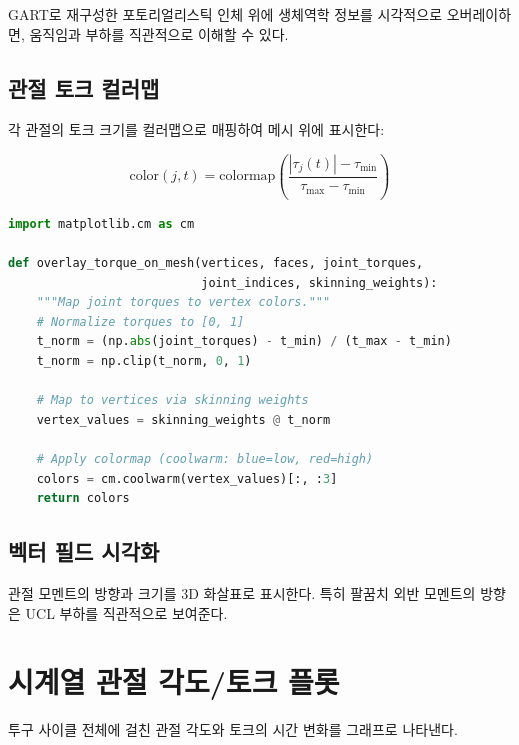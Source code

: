 \documentclass[11pt, a4paper]{report}
\begin{document}
GART로 재구성한 포토리얼리스틱 인체 위에 생체역학 정보를 시각적으로 오버레이하면,
움직임과 부하를 직관적으로 이해할 수 있다.

\subsection{관절 토크 컬러맵}

각 관절의 토크 크기를 컬러맵으로 매핑하여 메시 위에 표시한다:

\begin{equation}
  \text{color}(j, t) = \text{colormap}\!\left(\frac{|\tau_j(t)| - \tau_{\min}}{\tau_{\max} - \tau_{\min}}\right)
\end{equation}

\begin{codebox}[title={토크 오버레이 렌더링}]
\begin{lstlisting}[language=Python]
import matplotlib.cm as cm

def overlay_torque_on_mesh(vertices, faces, joint_torques,
                           joint_indices, skinning_weights):
    """Map joint torques to vertex colors."""
    # Normalize torques to [0, 1]
    t_norm = (np.abs(joint_torques) - t_min) / (t_max - t_min)
    t_norm = np.clip(t_norm, 0, 1)

    # Map to vertices via skinning weights
    vertex_values = skinning_weights @ t_norm

    # Apply colormap (coolwarm: blue=low, red=high)
    colors = cm.coolwarm(vertex_values)[:, :3]
    return colors
\end{lstlisting}
\end{codebox}

\subsection{벡터 필드 시각화}

관절 모멘트의 방향과 크기를 3D 화살표로 표시한다.
특히 팔꿈치 외반 모멘트의 방향은 UCL 부하를 직관적으로 보여준다.

\section{시계열 관절 각도/토크 플롯}

투구 사이클 전체에 걸친 관절 각도와 토크의 시간 변화를 그래프로 나타낸다.
\end{document}
